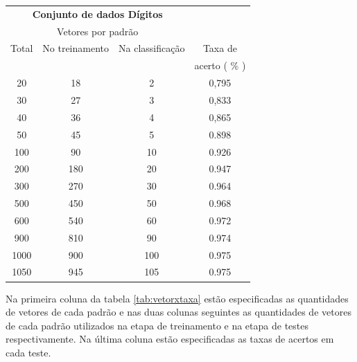 \begin{center}
	 \begin{tabular}{|c|c|c|c|}
    \cline{1-3}
    \multicolumn{3}{|c|}{\textbf{Conjunto de dados Dígitos}}                     \\ \cline{1-3}
    \multicolumn{3}{|c|}{Vetores por padrão}                    \\ \hline
    Total                     & No treinamento & Na classificação & Taxa de \\ ~                         & ~              & ~                & acerto ( \% ) \\ \hline
           20   &       18                 &            2       &       0,795\\ \hline
           30   &       27                 &            3       &       0,833\\ \hline 
           40   &       36                 &            4       &       0,865\\ \hline 
    	   50   & 	45		   &		5	& 	0.898\\ \hline
   	  100   & 	90		   &	       10	&	0.926\\ \hline
	  200   &      180   		   &	       20	&	0.947\\ \hline
    	  300 	&      270		   &	       30	&	0.964\\ \hline
    	  500 	&      450  		   & 	       50	&	0.968\\ \hline
    	  600 	&      540		   &	       60	&	0.972\\ \hline
    	  900 	&      810		   &	       90	&	0.974\\ \hline
    	 1000 	&      900		   &	      100	&	0.975\\ \hline
    	 1050 	&      945		   &	      105	&	0.975\\ \hline
	\end{tabular}
	\label{tab:vetorxtaxa}
\end{center}

Na primeira coluna da tabela \ref{tab:vetorxtaxa} estão especificadas as quantidades de vetores de cada padrão e nas duas colunas seguintes as quantidades de vetores de cada padrão utilizados na etapa de treinamento e na etapa de testes respectivamente. Na última coluna estão especificadas as taxas de acertos em cada teste. 

